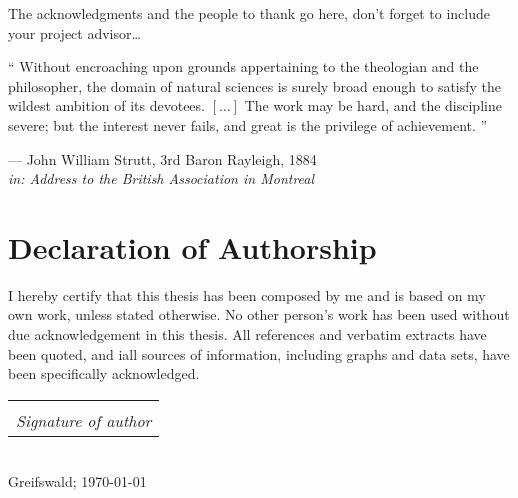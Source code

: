 \documentclass[
	10pt,
	twoside,
	chapterinoneline,
	onehalfspacing, %
	nolistspacing, %
	parskip, %
	headsepline, %
	english,
]{MastersDoctoralThesis} %
\makeatletter
\newcommand{\sign}[1]{%
  \begin{tabular}[t]{@{}c@{}}
  \makebox[1.5in]{\dotfill}\\
  \strut\emph{#1}\strut%
  \end{tabular}%
}
\makeatother
\begin{document}
	 \begin{acknowledgements}
	
		\addchaptertocentry{\acknowledgementname}
		The acknowledgments and the people to thank go here, don't forget to
	 	include your project advisor\ldots
	
	 \end{acknowledgements}
%
	\vspace*{0.33\textheight}
	\noindent\enquote{%
		Without encroaching upon grounds appertaining to the theologian and the
		philosopher, the domain of natural sciences is surely broad enough to
		satisfy the wildest ambition of its devotees. $\left[\dots\right]$
		The work may be hard, and the discipline severe; but the interest never
		fails, and great is the privilege of achievement.
	}\bigbreak%
	\begin{flushright}
		--- John William Strutt, 3rd Baron Rayleigh, 1884\\
		\small\emph{in: Address to the British Association in Montreal}
	\end{flushright}
%
	\chapter*{Declaration of Authorship}
		I hereby certify that this thesis has been composed by me and is based on 
		my own work, unless stated otherwise.	No other person’s work has been used
		without due acknowledgement in this thesis.
		All references and verbatim extracts have been quoted, and iall sources of
		information, including graphs and data sets, have been specifically
		acknowledged.\\[2.0cm]
		\begin{flushright}
			\sign{Signature of author}\\
			Greifswald; \today
		\end{flushright}
%
	\tableofcontents %
%
	
\mainmatter%
\pagestyle{thesis} %
\end{document}
